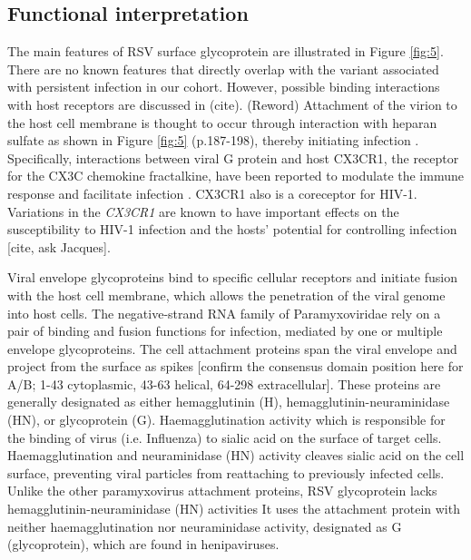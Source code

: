 \documentclass{article}
\begin{document}

\subsection{Functional interpretation}
The main features of RSV surface glycoprotein are illustrated in Figure \ref{fig:5}.
There are no known features that directly overlap with the variant associated with persistent infection in our cohort. 
However, possible binding interactions with host receptors are discussed in (cite).
(Reword) Attachment of the virion to the host cell membrane is thought to occur through interaction with heparan sulfate as shown in Figure \ref{fig:5}
(p.187-198), thereby initiating infection 
\cite{levine1987demonstration, feldman1999identification, feldman2000fusion}.
Specifically, interactions between viral G protein and host CX3CR1, the receptor for the CX3C chemokine fractalkine, have been reported to modulate the immune response and facilitate infection 
\cite{johnson2015respiratory, tripp2001cx3c, jeong2015cx3cr1}.
CX3CR1 also is a coreceptor for HIV-1. 
Variations in the \textit{CX3CR1} are known to have important effects on the susceptibility to HIV-1 infection and the hosts' potential for controlling infection [cite, ask Jacques].

Viral envelope glycoproteins bind to specific cellular receptors and initiate fusion with the host cell membrane, 
which allows the penetration of the viral genome into host cells. 
The negative-strand RNA family of Paramyxoviridae rely on a pair of binding and fusion functions for infection, mediated by one or multiple envelope glycoproteins.
The cell attachment proteins span the viral envelope and project from the surface as spikes 
[confirm the consensus domain position here for A/B; 1-43 cytoplasmic, 43-63 helical, 64-298 extracellular].
These proteins are generally designated as either hemagglutinin (H), hemagglutinin-neuraminidase (HN), or glycoprotein (G). 
Haemagglutination activity which is responsible for the binding of virus (i.e. Influenza) to sialic acid on the surface of target cells.
Haemagglutination and neuraminidase (HN) activity cleaves sialic acid on the cell surface, preventing viral particles from reattaching to previously infected cells. 
Unlike the other paramyxovirus attachment proteins, 
RSV glycoprotein lacks hemagglutinin-neuraminidase (HN) activities
It uses the attachment protein with neither haemagglutination nor neuraminidase activity, designated as G (glycoprotein), which are found in henipaviruses.
\cite{takimoto2002role, malvoisin1993measles, hu1992functional, horvath1992biological, bousse1994regions}
\end{document}
